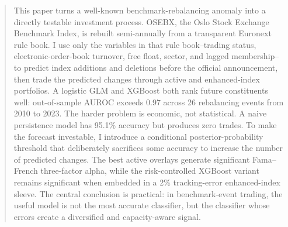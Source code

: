 \begin{abstract}
\noindent
This paper turns a well-known benchmark-rebalancing anomaly into a directly testable investment process. OSEBX, the Oslo Stock Exchange Benchmark Index, is rebuilt semi-annually from a transparent Euronext rule book. I use only the variables in that rule book--trading status, electronic-order-book turnover, free float, sector, and lagged membership--to predict index additions and deletions before the official announcement, then trade the predicted changes through active and enhanced-index portfolios. A logistic GLM and XGBoost both rank future constituents well: out-of-sample AUROC exceeds 0.97 across 26 rebalancing events from 2010 to 2023. The harder problem is economic, not statistical. A naive persistence model has 95.1\% accuracy but produces zero trades. To make the forecast investable, I introduce a conditional posterior-probability threshold that deliberately sacrifices some accuracy to increase the number of predicted changes. The best active overlays generate significant Fama--French three-factor alpha, while the risk-controlled XGBoost variant remains significant when embedded in a 2\% tracking-error enhanced-index sleeve. The central conclusion is practical: in benchmark-event trading, the useful model is not the most accurate classifier, but the classifier whose errors create a diversified and capacity-aware signal.
\end{abstract}
